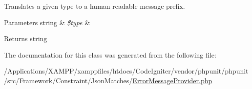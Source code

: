Translates a given type to a human readable message prefix.


\begin{DoxyParams}[1]{Parameters}
string & {\em \$type} & \\
\hline
\end{DoxyParams}
\begin{DoxyReturn}{Returns}
string 
\end{DoxyReturn}


The documentation for this class was generated from the following file\+:\begin{DoxyCompactItemize}
\item 
/\+Applications/\+X\+A\+M\+P\+P/xamppfiles/htdocs/\+Code\+Igniter/vendor/phpunit/phpunit/src/\+Framework/\+Constraint/\+Json\+Matches/\mbox{\hyperlink{_error_message_provider_8php}{Error\+Message\+Provider.\+php}}\end{DoxyCompactItemize}
